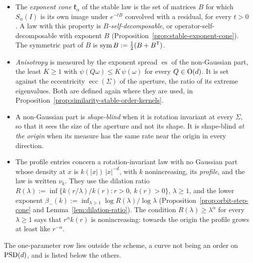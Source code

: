 \begin{itemize}
\item The \emph{exponent cone} $\mathfrak k_\alpha$ of the stable law is the set of matrices $B$ for which
$S_\alpha(I)$ is its own image under $e^{-tB}$ convolved with a residual, for every $t > 0$. A law with
this property is \emph{$B$-self-decomposable}, or operator-self-decomposable with exponent $B$
(Proposition~\ref{prop:stable-exponent-cone}). The symmetric part of $B$ is
$\mathrm{sym}\,B := \tfrac12(B + B^{\mathsf{T}})$.
\item \emph{Anisotropy} is measured by the exponent spread $\operatorname{es}$ of the non-Gaussian part,
the least $K \ge 1$ with $\psi(Q\omega) \le K\,\psi(\omega)$ for every $Q \in \mathrm{O}(d)$. It is set
against the eccentricity $\operatorname{ecc}(\Sigma)$ of the aperture, the ratio of its extreme
eigenvalues. Both are defined again where they are used, in Proposition~\ref{prop:similarity-stable-order-kernels}.
\item A non-Gaussian part is \emph{shape-blind} when it is rotation invariant at every $\Sigma$, so that
it sees the size of the aperture and not its shape. It is shape-blind \emph{at the origin} when its
\Levy{} measure has the same rate near the origin in every direction.
\item The profile entries concern a rotation-invariant law with no Gaussian part whose \Levy{}
density at $x$ is $k(|x|)\,|x|^{-d}$, with $k$ nonincreasing, its \emph{profile}, and the law is
written $\nu_k$. They use the
dilation ratio $R(\lambda) := \inf\{k(r/\lambda)/k(r) : r > 0,\ k(r) > 0\}$, $\lambda \ge 1$, and the
lower exponent $\beta_-(k) := \inf_{\lambda > 1}\log R(\lambda)/\log\lambda$
(Proposition~\ref{prop:orbit-step-cone} and Lemma~\ref{lem:dilation-ratio}).
The condition $R(\lambda) \ge \lambda^\alpha$ for every $\lambda \ge 1$ says that $r^\alpha k(r)$ is
nonincreasing: towards the origin the profile grows at least like $r^{-\alpha}$.
\end{itemize}
The one-parameter row lies outside the scheme, a curve not being an order on $\mathrm{PSD}(d)$, and is listed
below the others.

